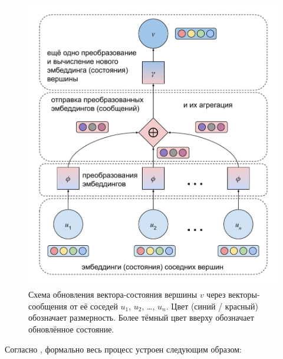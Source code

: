 
\begin{figure}[ht]
\begin{center}
    \includegraphics[scale=0.75]{./assets/message-passing-nn-architecture.pdf}
    \caption{\label{message-passing-nn-architecture} Схема обновления вектора-состояния вершины $v$ через векторы-сообщения от её соседей $u_1$, $u_2$, \ldots, $u_n$. Цвет (синий / красный) обозначает размерность. Более тёмный цвет вверху обозначает обновлённое состояние.}
\end{center}
\end{figure}

Согласно \cite{gnn-deep-learning-5g}, формально весь процесс устроен следующим образом:

